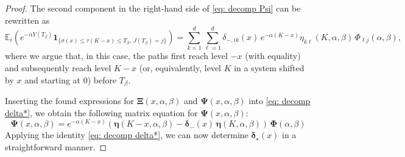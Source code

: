 \documentclass[10pt,a4paper]{amsart}
\newcommand{\bs}{\boldsymbol}
\begin{document}
\begin{proof}
The second component in the right-hand side of \eqref{eq: decomp Psi} can be rewritten as
\begin{equation*}
        {\mathbb E}_i\left(e^{-\alpha Y(T_{\beta})}{\bs 1}_{\{\sigma(x)\leqslant\tau(K-x)\leqslant T_{\beta},\,J(T_{\beta})=j\}}\right) = \sum_{k=1}^d\sum_{\ell=1}^d\delta_{-,ik}(x)\,e^{-\alpha(K-x)}\eta_{k\ell}(K,\alpha,\beta)\,\Phi_{\ell j}(\alpha,\beta),
    \end{equation*}
where we argue that, in this case, the paths first reach level $-x$ (with equality) and subsequently reach level $K-x$ (or, equivalently, level $K$ in a system shifted by $x$ and starting at $0$) before $T_{\beta}$.

\medskip

Inserting the found expressions for ${\bs \Xi}(x,\alpha,\beta)$ and ${\bs \Psi}(x,\alpha,\beta)$ into \eqref{eq: decomp delta*}, we obtain the following matrix equation for $\bs{\Psi}(x,\alpha,\beta)$:
\begin{equation*}
    {\bs \Psi}(x,\alpha,\beta) = e^{-\alpha(K-x)}\left(\bs{\eta}(K-x, \alpha, \beta) - \bs{\delta}_{-}(x)\,\bs{\eta}(K,\alpha,\beta)\right)\,\bs{\Phi}(\alpha,\beta)
\end{equation*}
Applying the identity \eqref{eq: decomp delta*}, we can now determine $\bs\delta_{\star}(x)$ in a straightforward manner.
\end{proof}
\end{document}
